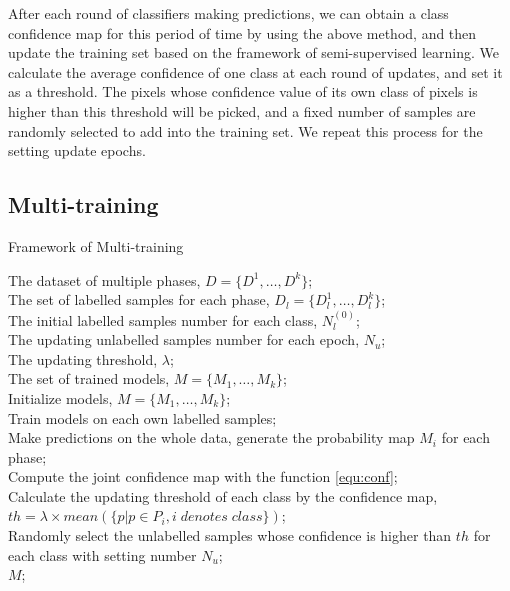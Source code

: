 \documentclass{isprs} %
\begin{document}
After each round of classifiers making predictions, we can obtain a class confidence map for this period of time by using the above method, and then update the training set based on the framework of semi-supervised learning. We calculate the average confidence of one class at each round of updates, and set it as a threshold. The pixels whose confidence value of its own class of pixels is higher than this threshold will be picked, and a fixed number of samples are randomly selected to add into the training set. We repeat this process for the setting update epochs. 

\subsection{Multi-training}\label{sec:Multi-training}

\begin{algorithm}[htb] 
	\renewcommand{\algorithmicrequire}{\textbf{Input:}}
	\renewcommand{\algorithmicensure}{\textbf{Output:}}
	\caption{ Framework of Multi-training} 
	\label{alg:Framwork} 
	\begin{algorithmic}[1] 
	\REQUIRE
	The dataset of multiple phases, $D=\{D^1,\dots,D^k\}$;\\
	The set of labelled samples for each phase, $D_{l}=\{D_l^1,\dots,D_l^k\}$;\\
	The initial labelled samples number for each class, $N_l^{(0)}$;\\
	The updating unlabelled samples number for each epoch, $N_u$;\\
	The updating threshold, $\lambda$;\\
	\ENSURE
	The set of trained models, $M=\{M_1,\dots,M_k\}$;\\
	\STATE Initialize models, $M=\{M_1,\dots,M_k\}$;\\ 
	\label{code:fram:init}
	\STATE Train models on each own labelled samples;\\
	\label{code:fram:train}
	\STATE Make predictions on the whole data, generate the probability map $M_i$ for each phase; \\
	\label{code:fram:predict}
	\STATE Compute the joint confidence map with the function \ref{equ:conf};\\
	\label{code:fram:calcconf}
	\STATE Calculate the updating threshold of each class by the confidence map, $th=\lambda\times mean(\{p|p\in P_{i}, i\; denotes\;class\})$;\\
	\label{code:fram:thre}
	\STATE Randomly select the unlabelled samples whose confidence is higher than $th$ for each class with setting number $N_u$;\\
	\label{code:fram:update}
	\ENDFOR
	\RETURN $M$; 
	\end{algorithmic}
\end{algorithm}
\end{document}
